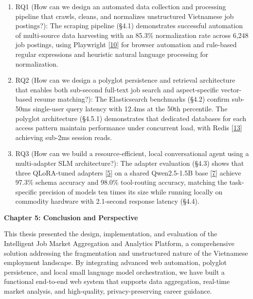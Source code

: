 \documentclass[12pt, a4paper]{report}
\renewcommand{\textit}[1]{\textup{#1}}
\begin{document}
\begin{enumerate}
    \item RQ1 (\textit{How can we design an automated data collection and processing pipeline that crawls, cleans, and normalizes unstructured Vietnamese job postings?}): The scraping pipeline (§4.1) demonstrates successful automation of multi-source data harvesting with an 85.3\% normalization rate across 6,248 job postings, using Playwright [\hyperlink{cite10}{10}] for browser automation and rule-based regular expressions and heuristic natural language processing for normalization.
    \item RQ2 (\textit{How can we design a polyglot persistence and retrieval architecture that enables both sub-second full-text job search and aspect-specific vector-based resume matching?}): The Elasticsearch benchmarks (§4.2) confirm sub-50ms single-user query latency with 12.4ms at the 50th percentile. The polyglot architecture (§4.5.1) demonstrates that dedicated databases for each access pattern maintain performance under concurrent load, with Redis [\hyperlink{cite13}{13}] achieving sub-2ms session reads.
    \item RQ3 (\textit{How can we build a resource-efficient, local conversational agent using a multi-adapter SLM architecture?}): The adapter evaluation (§4.3) shows that three QLoRA-tuned adapters [\hyperlink{cite5}{5}] on a shared Qwen2.5-1.5B base [\hyperlink{cite7}{7}] achieve 97.3\% schema accuracy and 98.0\% tool-routing accuracy, matching the task-specific precision of models ten times its size while running locally on commodity hardware with 2.1-second response latency (§4.4).
\end{enumerate}

\newpage
\begin{center}
    {\Huge \textbf{Chapter 5: Conclusion and Perspective}\par}
\end{center}
\vspace{1cm}

\vspace{0.8cm}
\vspace{0.4cm}

\setlength{\parindent}{0.7cm}
\setlength{\parskip}{0.1cm}

This thesis presented the design, implementation, and evaluation of the Intelligent Job Market Aggregation and Analytics Platform, a comprehensive solution addressing the fragmentation and unstructured nature of the Vietnamese employment landscape. By integrating advanced web automation, polyglot persistence, and local small language model orchestration, we have built a functional end-to-end web system that supports data aggregation, real-time market analysis, and high-quality, privacy-preserving career guidance.
\end{document}
